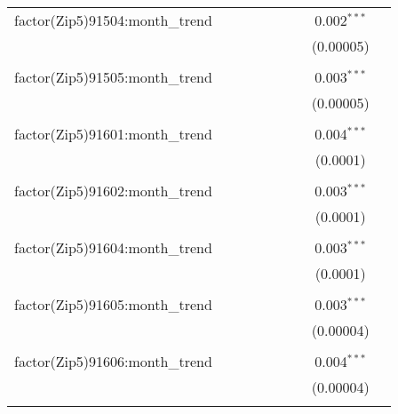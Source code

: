 \begin{table}[H]
{\begin{tabular}{@{\extracolsep{5pt}}lcccccccc}
  factor(Zip5)91504:month\_trend &  &  &  &  &  &  & 0.002$^{***}$ &  \\  

   &  &  &  &  &  &  & (0.00005) &  \\  

   & & & & & & & & \\  

  factor(Zip5)91505:month\_trend &  &  &  &  &  &  & 0.003$^{***}$ &  \\  

   &  &  &  &  &  &  & (0.00005) &  \\  

   & & & & & & & & \\  

  factor(Zip5)91601:month\_trend &  &  &  &  &  &  & 0.004$^{***}$ &  \\  

   &  &  &  &  &  &  & (0.0001) &  \\  

   & & & & & & & & \\  

  factor(Zip5)91602:month\_trend &  &  &  &  &  &  & 0.003$^{***}$ &  \\  

   &  &  &  &  &  &  & (0.0001) &  \\  

   & & & & & & & & \\  

  factor(Zip5)91604:month\_trend &  &  &  &  &  &  & 0.003$^{***}$ &  \\  

   &  &  &  &  &  &  & (0.0001) &  \\  

   & & & & & & & & \\  

  factor(Zip5)91605:month\_trend &  &  &  &  &  &  & 0.003$^{***}$ &  \\  

   &  &  &  &  &  &  & (0.00004) &  \\  

   & & & & & & & & \\  

  factor(Zip5)91606:month\_trend &  &  &  &  &  &  & 0.004$^{***}$ &  \\  

   &  &  &  &  &  &  & (0.00004) &  \\  

   & & & & & & & & \\  


\end{tabular}}
\end{table}
